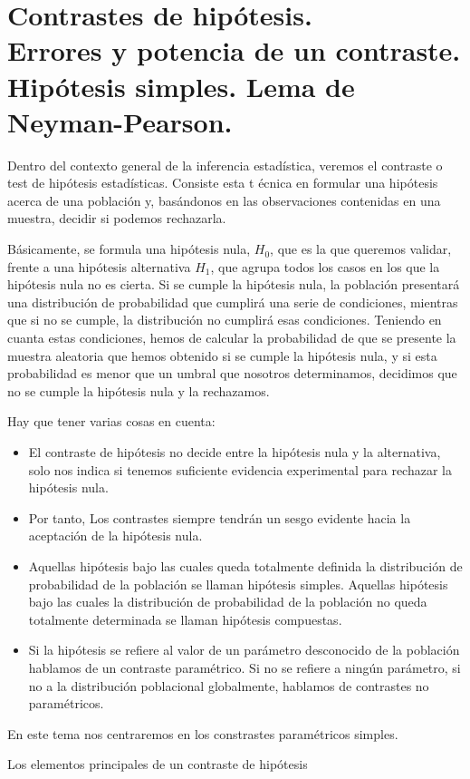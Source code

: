 \chapter[Contrastes de hip\'otesis.]{Contrastes de hip\'otesis. \\
\normalsize Errores y potencia de un contraste. Hip\'otesis simples. Lema de Neyman-Pearson.}


Dentro del contexto general de la inferencia estad\'istica, veremos el contraste o test de hip\'otesis estad\'isticas. Consiste esta t \'ecnica en formular una hip\'otesis acerca de una poblaci\'on y, bas\'andonos en las observaciones contenidas en una muestra, decidir si podemos rechazarla.

B\'asicamente, se formula una hip\'otesis nula, $H_0$, que es la que queremos validar, frente a una hip\'otesis alternativa $H_1$, que agrupa todos los casos en los que la hip\'otesis nula no es cierta. Si se cumple la hip\'otesis nula, la poblaci\'on presentar\'a una distribuci\'on de probabilidad que cumplir\'a una serie de condiciones, mientras que si no se cumple, la distribuci\'on no cumplir\'a esas condiciones. Teniendo en cuanta estas condiciones, hemos de calcular la probabilidad de que se presente la muestra aleatoria que hemos obtenido si se cumple la hip\'otesis nula, y si esta probabilidad es menor que un umbral que nosotros determinamos, decidimos que no se cumple la hip\'otesis nula y la rechazamos.

Hay que tener varias cosas en cuenta:
\begin{itemize}
\item El contraste de hip\'otesis no decide entre la hip\'otesis nula y la alternativa, solo nos indica si tenemos suficiente evidencia experimental para rechazar la hip\'otesis nula.
\item Por tanto, Los contrastes siempre tendr\'an un sesgo evidente hacia la aceptaci\'on de la hip\'otesis nula.
\item Aquellas hip\'otesis bajo las cuales queda totalmente definida la distribuci\'on de probabilidad de la poblaci\'on se llaman hip\'otesis simples. Aquellas hip\'otesis bajo las cuales la distribuci\'on de probabilidad de la poblaci\'on no queda totalmente determinada se llaman hip\'otesis compuestas.
\item Si la hip\'otesis se refiere al valor de un par\'ametro desconocido de la poblaci\'on hablamos de un contraste param\'etrico. Si no se refiere a ning\'un par\'ametro, si no a la distribuci\'on poblacional globalmente, hablamos de contrastes no param\'etricos.
\end{itemize}

En este tema nos centraremos en los constrastes param\'etricos simples.


Los elementos principales de un contraste de hip\'otesis